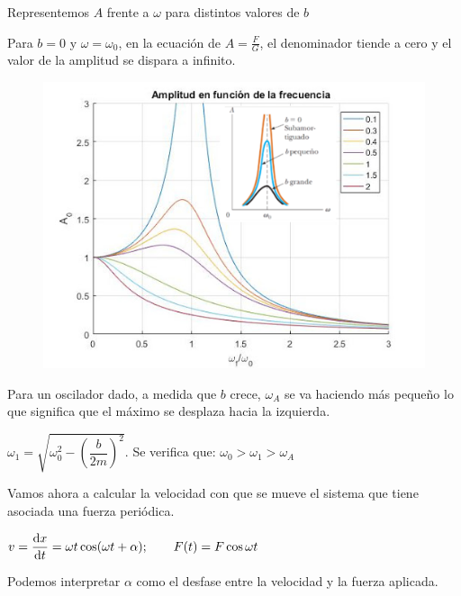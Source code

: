 Representemos $A$ frente a $\omega$ para distintos valores de $b$

Para $b=0$ y $\omega=\omega_0$, en la ecuación de $A=\frac F G$, el denominador tiende a cero y el valor de la amplitud se dispara a infinito.

\vspace{10mm} %
\begin{figure}[H]
		\centering
		\includegraphics[width=.8\textwidth]{imagenes/imagenes20/T20IM08.png}
\end{figure}	
\vspace{10mm} %
Para un oscilador dado, a medida que $b$ crece, $\omega_A$ se va haciendo más pequeño lo que significa que el máximo se desplaza hacia la izquierda.

$\omega_1=\sqrt{\omega_0^2-\left( \dfrac b{2m} \right)^2}$. \hspace{5mm} Se verifica que: $\omega_0>\omega_1>\omega_A$

Vamos ahora a calcular la velocidad con que se mueve el sistema que tiene asociada una fuerza periódica.

$\displaystyle v=\dv{x}{t}=\omega t \cos(\omega t + \alpha); \qquad F(t)=F\cos \omega t$

Podemos interpretar $\alpha$ como el desfase entre la velocidad y la fuerza aplicada.

